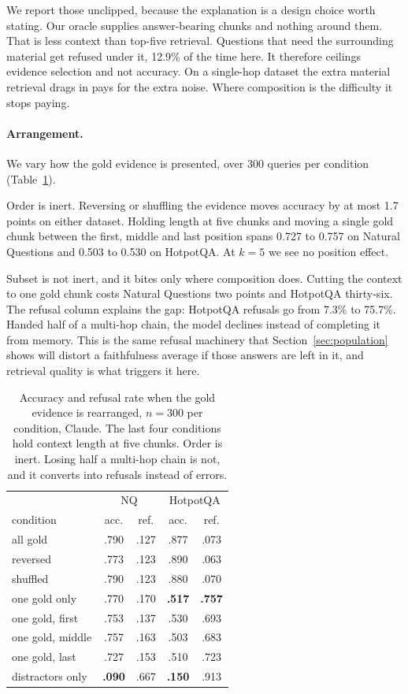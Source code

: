 \documentclass[11pt]{article}
\begin{document}
We report those unclipped, because the explanation is a design choice worth stating. Our oracle supplies answer-bearing chunks and nothing around them. That is less context than top-five retrieval. Questions that need the surrounding material get refused under it, 12.9\% of the time here. It therefore ceilings evidence selection and not accuracy. On a single-hop dataset the extra material retrieval drags in pays for the extra noise. Where composition is the difficulty it stops paying.

\paragraph{Arrangement.} We vary how the gold evidence is presented, over 300 queries per condition (Table~\ref{tab:ablation}).

Order is inert. Reversing or shuffling the evidence moves accuracy by at most 1.7 points on either dataset. Holding length at five chunks and moving a single gold chunk between the first, middle and last position spans 0.727 to 0.757 on Natural Questions and 0.503 to 0.530 on HotpotQA. At $k = 5$ we see no position effect.

Subset is not inert, and it bites only where composition does. Cutting the context to one gold chunk costs Natural Questions two points and HotpotQA thirty-six. The refusal column explains the gap: HotpotQA refusals go from 7.3\% to 75.7\%. Handed half of a multi-hop chain, the model declines instead of completing it from memory. This is the same refusal machinery that Section~\ref{sec:population} shows will distort a faithfulness average if those answers are left in it, and retrieval quality is what triggers it here.

\begin{table}[t]
\centering\small
\begin{tabular}{lcccc}
\hline
 & \multicolumn{2}{c}{NQ} & \multicolumn{2}{c}{HotpotQA} \\
condition & acc. & ref. & acc. & ref. \\
\hline
all gold & .790 & .127 & .877 & .073 \\
reversed & .773 & .123 & .890 & .063 \\
shuffled & .790 & .123 & .880 & .070 \\
one gold only & .770 & .170 & \textbf{.517} & \textbf{.757} \\
one gold, first & .753 & .137 & .530 & .693 \\
one gold, middle & .757 & .163 & .503 & .683 \\
one gold, last & .727 & .153 & .510 & .723 \\
distractors only & \textbf{.090} & .667 & \textbf{.150} & .913 \\
\hline
\end{tabular}
\caption{Accuracy and refusal rate when the gold evidence is rearranged, $n = 300$ per condition, Claude. The last four conditions hold context length at five chunks. Order is inert. Losing half a multi-hop chain is not, and it converts into refusals instead of errors.}
\label{tab:ablation}
\end{table}
\end{document}
